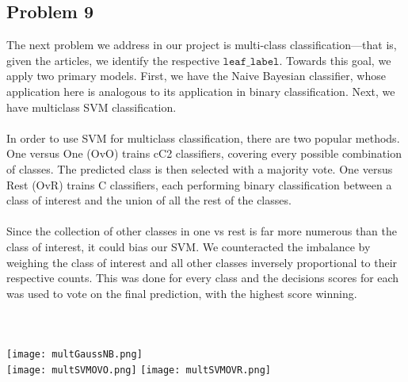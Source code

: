 \documentclass[11pt]{article}
\begin{document}
\begin{multicols}{2}
\subsection*{Problem 9}
The next problem we address in our project is multi-class classification—that is, given the articles, we identify the respective $\texttt{leaf\_label}$. Towards this goal, we apply two primary models. First, we have the Naive Bayesian classifier, whose application here is analogous to its application in binary classification. Next, we have multiclass SVM classification. \\\\ %
In order to use SVM for multiclass classification, there are two popular methods. One versus One (OvO) trains cC2 classifiers, covering every possible combination of classes. The predicted class is then selected with a majority vote. One versus Rest (OvR) trains C classifiers, each performing binary classification between a class of interest and the union of all the rest of the classes.\\\\
Since the collection of other classes in one vs rest is far more numerous than the class of interest, it could bias our SVM. We counteracted the imbalance by weighing the class of interest and all other classes  inversely proportional to their respective counts. This was done for every class and the decisions scores for each was used to vote on the final prediction, with the highest score winning. \\\\
 \\\\
\texttt{[image: multGaussNB.png]} \\
\texttt{[image: multSVMOVO.png]}
\texttt{[image: multSVMOVR.png]} \\\\

\end{multicols}
\end{document}
